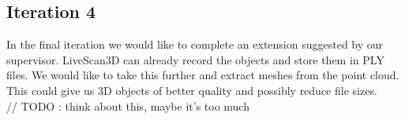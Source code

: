 \documentclass[a4paper,12pt]{article}
\begin{document}
\subsection*{Iteration 4}
\iffalse
You don't necessarily need to generate meshes from the recordings. You could keep it as a set of 3D points (probably stored in some efficient data structure). When doing playback, you simply render the points but should allow the virtual camera to change.
\fi
In the final iteration we would like to complete an extension suggested by our supervisor. LiveScan3D can already record the objects and store them in PLY files. We would like to take this further and extract meshes from the point cloud. This could give us 3D objects of better quality and possibly reduce file sizes. \\
// TODO : think about this, maybe it's too much
\end{document}
